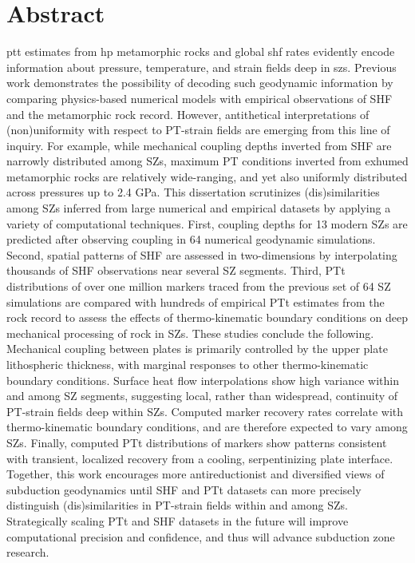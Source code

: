 \documentclass[
      12pt,
            twoside]{report}
\begin{document}

  \chapter*{Abstract}
  \Gls{ptt} estimates from \gls{hp} metamorphic rocks and global \gls{shf} rates evidently encode information about pressure, temperature, and strain fields deep in \glspl{sz}. Previous work demonstrates the possibility of decoding such geodynamic information by comparing physics-based numerical models with empirical observations of SHF and the metamorphic rock record. However, antithetical interpretations of (non)uniformity with respect to PT-strain fields are emerging from this line of inquiry. For example, while mechanical coupling depths inverted from SHF are narrowly distributed among SZs, maximum PT conditions inverted from exhumed metamorphic rocks are relatively wide-ranging, and yet also uniformly distributed across pressures up to 2.4 GPa. This dissertation scrutinizes (dis)similarities among SZs inferred from large numerical and empirical datasets by applying a variety of computational techniques. First, coupling depths for 13 modern SZs are predicted after observing coupling in 64 numerical geodynamic simulations. Second, spatial patterns of SHF are assessed in two-dimensions by interpolating thousands of SHF observations near several SZ segments. Third, PTt distributions of over one million markers traced from the previous set of 64 SZ simulations are compared with hundreds of empirical PTt estimates from the rock record to assess the effects of thermo-kinematic boundary conditions on deep mechanical processing of rock in SZs. These studies conclude the following. Mechanical coupling between plates is primarily controlled by the upper plate lithospheric thickness, with marginal responses to other thermo-kinematic boundary conditions. Surface heat flow interpolations show high variance within and among SZ segments, suggesting local, rather than widespread, continuity of PT-strain fields deep within SZs. Computed marker recovery rates correlate with thermo-kinematic boundary conditions, and are therefore expected to vary among SZs. Finally, computed PTt distributions of markers show patterns consistent with transient, localized recovery from a cooling, serpentinizing plate interface. Together, this work encourages more antireductionist and diversified views of subduction geodynamics until SHF and PTt datasets can more precisely distinguish (dis)similarities in PT-strain fields within and among SZs. Strategically scaling PTt and SHF datasets in the future will improve computational precision and confidence, and thus will advance subduction zone research.
\end{document}
